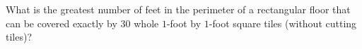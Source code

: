 What is the greatest number of feet in the perimeter of a rectangular floor that can be covered exactly by $30$ whole $1$-foot by $1$-foot square tiles (without cutting tiles)?
